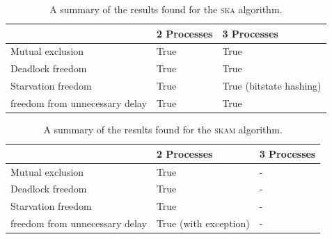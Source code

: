 \documentclass[a4paper,10pt]{llncs}
\begin{document}
\begin{table}

\caption{A summary of the results found for the \textsc{ska} algorithm.}
    \begin{tabular}{l|ll}
    
        ~                              & 2 Processes & 3 Processes             \\ \hline
        Mutual exclusion               & True        & True                    \\ 
        Deadlock freedom               & True        & True                    \\ 
        Starvation freedom             & True        & True (bitstate hashing) \\ 
        freedom from unnecessary delay & True        & True                    \\

    \end{tabular}
\label{tab:skaResults}
\end{table}


\begin{table}[]
\caption{A summary of the results found for the \textsc{skam} algorithm.}

    \begin{tabular}{l|ll}
    
        ~                              & 2 Processes & 3 Processes             \\ \hline
        Mutual exclusion               & True        & -                    \\ 
        Deadlock freedom               & True        & -                    \\ 
        Starvation freedom             & True        & - \\ 
        freedom from unnecessary delay & True (with exception)       & -                    \\

    \end{tabular}
\label{tab:skamResults}
\end{table}
\end{document}
